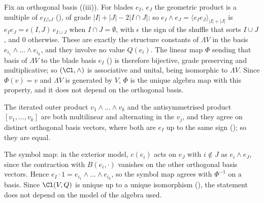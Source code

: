 Fix an orthogonal basis ((iii)). For blades $e_I$, $e_J$ the geometric product is a multiple of $e_{I \triangle J}$ (), of grade $|I| + |J| - 2|I \cap J|$; so $e_I \wedge e_J = \langle e_I e_J \rangle_{|I|+|J|}$ is $e_I e_J = \epsilon(I, J)\, e_{I \cup J}$ when $I \cap J = \emptyset$, with $\epsilon$ the sign of the shuffle that sorts $I \cup J$, and $0$ otherwise. These are exactly the structure constants of $\Lambda V$ in the basis $e_{i_1} \wedge \dots \wedge e_{i_k}$, and they involve no value $Q(e_i)$. The linear map $\Phi$ sending that basis of $\Lambda V$ to the blade basis $e_I$ () is therefore bijective, grade preserving and multiplicative; so $(\Cl, \wedge)$ is associative and unital, being isomorphic to $\Lambda V$. Since $\Phi(v) = v$ and $\Lambda V$ is generated by $V$, $\Phi$ is the unique algebra map with this property, and it does not depend on the orthogonal basis.

The iterated outer product $v_1 \wedge \dots \wedge v_k$ and the antisymmetrised product $[v_1, \dots, v_k]$ are both multilinear and alternating in the $v_j$, and they agree on distinct orthogonal basis vectors, where both are $e_I$ up to the same sign (); so they are equal.

The symbol map: in the exterior model, $c(e_i)$ acts on $e_J$ with $i \notin J$ as $e_i \wedge e_J$, since the contraction with $B(e_i, \cdot)$ vanishes on the other orthogonal basis vectors. Hence $e_I \cdot 1 = e_{i_1} \wedge \dots \wedge e_{i_k}$, so the symbol map agrees with $\Phi^{-1}$ on a basis. Since $\Cl(V, Q)$ is unique up to a unique isomorphism (), the statement does not depend on the model of the algebra used.
